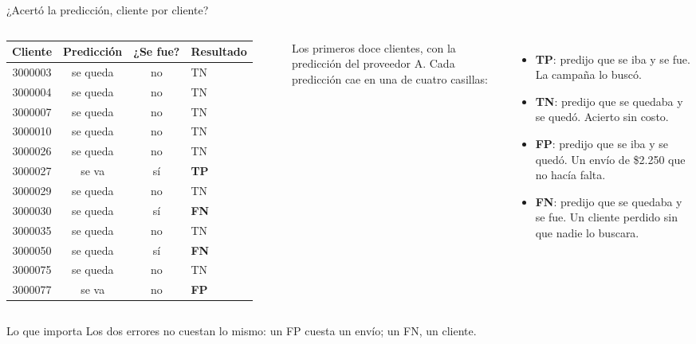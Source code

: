 \documentclass{beamer}
\begin{document}
\begin{frame}{¿Acertó la predicción, cliente por cliente?}
\small
\begin{columns}[T]
\centering
\scriptsize
\setlength{\tabcolsep}{3pt}
\begin{tabular}{@{}c c c l@{}}
\toprule
\textbf{Cliente} & \textbf{Predicción} & \textbf{¿Se fue?} & \textbf{Resultado} \\
\midrule
3000003 & se queda & no & TN \\
3000004 & se queda & no & TN \\
3000007 & se queda & no & TN \\
3000010 & se queda & no & TN \\
3000026 & se queda & no & TN \\
\rowcolor{grisclaro} 3000027 & se va & sí & \textbf{TP} \\
3000029 & se queda & no & TN \\
\rowcolor{grisclaro} 3000030 & se queda & sí & \textbf{FN} \\
3000035 & se queda & no & TN \\
\rowcolor{grisclaro} 3000050 & se queda & sí & \textbf{FN} \\
3000075 & se queda & no & TN \\
\rowcolor{grisclaro} 3000077 & se va & no & \textbf{FP} \\
\bottomrule
\end{tabular}

\vspace{0.05cm}
\tiny Los primeros doce clientes, con la predicción del proveedor A.
\footnotesize
Cada predicción cae en una de cuatro casillas:
\begin{itemize} \setlength{\itemsep}{0.1cm}
  \item \textbf{TP}: predijo que se iba y se fue. La campaña lo buscó.
  \item \textbf{TN}: predijo que se quedaba y se quedó. Acierto sin costo.
  \item \textcolor{rojoal}{\textbf{FP}}: predijo que se iba y se quedó. Un envío de \$2.250 que no hacía falta.
  \item \textcolor{rojoal}{\textbf{FN}}: predijo que se quedaba y se fue. Un cliente perdido sin que nadie lo buscara.
\end{itemize}
\end{columns}
\pause
\vspace{0.1cm}
\begin{alertblock}{Lo que importa}
Los dos errores no cuestan lo mismo: un FP cuesta un envío; un FN, un cliente.
\end{alertblock}
\end{frame}
\end{document}
